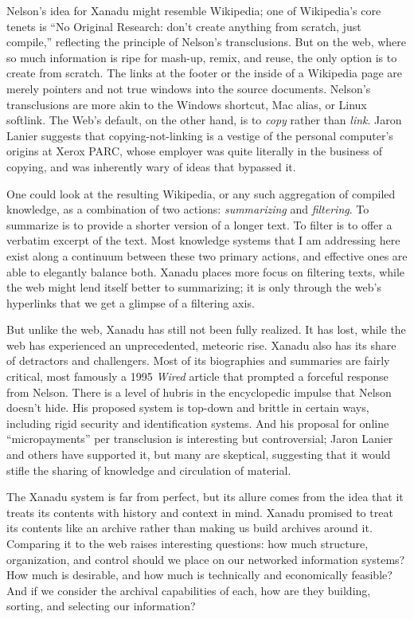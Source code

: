 Nelson's idea for Xanadu might resemble Wikipedia; one of Wikipedia's core tenets is ``No Original Research: don't create anything from scratch, just compile,'' reflecting the principle of Nelson's transclusions.\autocite[11-12]{reagle_good_2010} But on the web, where so much information is ripe for mash-up, remix, and reuse, the only option is to create from scratch. The links at the footer or the inside of a Wikipedia page are merely pointers and not true windows into the source documents. Nelson's transclusions are more akin to the Windows shortcut, Mac alias, or Linux softlink. The Web's default, on the other hand, is to \emph{copy} rather than \emph{link}. Jaron Lanier suggests that copying-not-linking is a vestige of the personal computer's origins at Xerox PARC, whose employer was quite literally in the business of copying, and was inherently wary of ideas that bypassed it.\autocite[221-232]{lanier_who_2013}

One could look at the resulting Wikipedia, or any such aggregation of compiled knowledge, as a combination of two actions: \emph{summarizing} and \emph{filtering}. To summarize is to provide a shorter version of a longer text. To filter is to offer a verbatim excerpt of the text. Most knowledge systems that I am addressing here exist along a continuum between these two primary actions, and effective ones are able to elegantly balance both. Xanadu places more focus on filtering texts, while the web might lend itself better to summarizing; it is only through the web's hyperlinks that we get a glimpse of a filtering axis.

But unlike the web, Xanadu has still not been fully realized. It has lost, while the web has experienced an unprecedented, meteoric rise. Xanadu also has its share of detractors and challengers. Most of its biographies and summaries are fairly critical, most famously a 1995 \emph{Wired} article that prompted a forceful response from Nelson.\autocite{wolf_curse_1995} There is a level of hubris in the encyclopedic impulse that Nelson doesn't hide. His proposed system is top-down and brittle in certain ways, including rigid security and identification systems. And his proposal for online ``micropayments'' per transclusion is interesting but controversial; Jaron Lanier and others have supported it, but many are skeptical, suggesting that it would stifle the sharing of knowledge and circulation of material.\autocite[221-232]{atwood_xanadu_2009,lanier_who_2013}

The Xanadu system is far from perfect, but its allure comes from the idea that it treats its contents with history and context in mind. Xanadu promised to treat its contents like an archive rather than making us build archives around it. Comparing it to the web raises interesting questions: how much structure, organization, and control should we place on our networked information systems? How much is desirable, and how much is technically and economically feasible? And if we consider the archival capabilities of each, how are they building, sorting, and selecting our information?

